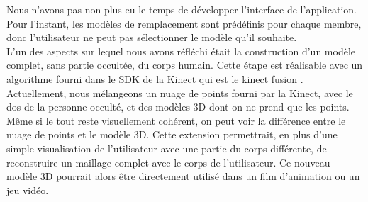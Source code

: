 Nous n'avons pas non plus eu le temps de développer l'interface de l'application. Pour l'instant, les modèles de remplacement
sont prédéfinis pour chaque membre, donc l'utilisateur ne peut pas sélectionner le modèle qu'il souhaite.\\

L'un des aspects sur lequel nous avons réfléchi était la construction d'un modèle complet, sans partie occultée, du corps
humain. Cette étape est réalisable avec un algorithme fourni dans le SDK de la Kinect qui est le \og kinect fusion \fg\cite{
KinectFusion}. Actuellement, nous mélangeons un nuage de points fourni par la Kinect, avec le dos de la personne occulté, et 
des modèles 3D dont on ne prend que les points. Même si le tout reste visuellement cohérent, on peut voir la différence entre
le nuage de points et le modèle 3D.
Cette extension permettrait, en plus d'une simple visualisation de l'utilisateur avec une partie du corps
différente, de reconstruire un maillage complet avec le corps de l'utilisateur. Ce nouveau modèle 3D pourrait alors être
directement utilisé dans un film d'animation ou un jeu vidéo.
